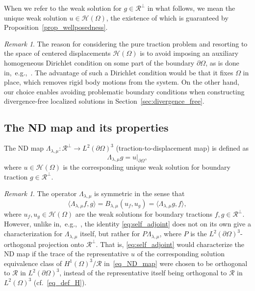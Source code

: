 \documentclass[reqno]{amsart}
\numberwithin{equation}{section}
\numberwithin{figure}{section}
\numberwithin{table}{section}
\newcommand{\inner}[1]{\langle#1\rangle}
\theoremstyle{definition}
\theoremstyle{plain}
\theoremstyle{definition}
\theoremstyle{remark}
\newtheorem{rem}[thm]{Remark}
\numberwithin{equation}{section}
\begin{document}
When we refer to the weak solution for $g \in \mathcal{R}^\perp$ in what follows, we mean the unique weak solution $u\in\mathcal{H}(\Omega)$, the existence of which is guaranteed by Proposition~\ref{prop_wellposedness}. 

\begin{rem} \label{rem_bc}
	The reason for considering the pure traction problem and resorting to the space of centered displacements $\mathcal H(\Omega)$ is to avoid imposing an auxiliary homogeneous Dirichlet condition on some part of the boundary $\partial\Omega$, as is done in,~e.g.,~\cite{EGH25,EH21,EP23}. The advantage of such a Dirichlet condition would be that it fixes $\Omega$ in place, which removes rigid body motions from the system. On the other hand, our choice enables avoiding problematic boundary conditions when constructing divergence-free localized solutions in Section~\ref{sec:divergence_free}.
\end{rem}

\subsection{The ND map and its properties}

The ND map $\Lambda_{\lambda, \mu}\colon \mathcal{R}^{\perp} \to L^2(\partial\Omega)^3$ (traction\hyp to\hyp displacement map) is defined as 
%
\begin{equation} \label{eq_ND_map}
	\Lambda_{\lambda, \mu}g = u|_{\partial\Omega},
\end{equation}
%
where $u\in \mathcal{H}(\Omega)$ is the corresponding unique weak solution for boundary traction $g\in\mathcal{R}^\perp$. 

\begin{rem}
	The operator $\Lambda_{\lambda, \mu}$ is symmetric in the sense that
	\begin{equation} \label{eq:self_adjoint}
		\inner{\Lambda_{\lambda,\mu} f, g} = B_{\lambda, \mu}(u_f, u_g) = \inner{\Lambda_{\lambda,\mu} g, f},
	\end{equation}
	where $u_f, u_g \in \mathcal{H}(\Omega)$ are the weak solutions for boundary tractions $f, g \in \mathcal{R}^\perp$. However, unlike in,~e.g.,~\cite{EH21,EGH25}, the identity \eqref{eq:self_adjoint} does not on its own give a characterization for $\Lambda_{\lambda,\mu}$ itself, but rather for $P \Lambda_{\lambda,\mu}$, where $P$ is the $L^2(\partial\Omega)^3$-orthogonal projection onto $\mathcal{R}^\perp$. That is, \eqref{eq:self_adjoint} would characterize the ND map if the trace of the representative $u$ of the corresponding solution equivalence class of $H^1(\Omega)^3 / \mathcal{R}$ in~\eqref{eq_ND_map} were chosen to be
orthogonal to $\mathcal{R}$ in $L^2(\partial \Omega)^3$, instead of the representative itself being orthogonal to $\mathcal{R}$ in 
$L^2(\Omega)^3$ (cf.~\eqref{eq_def_H}).
\end{rem}
\end{document}
